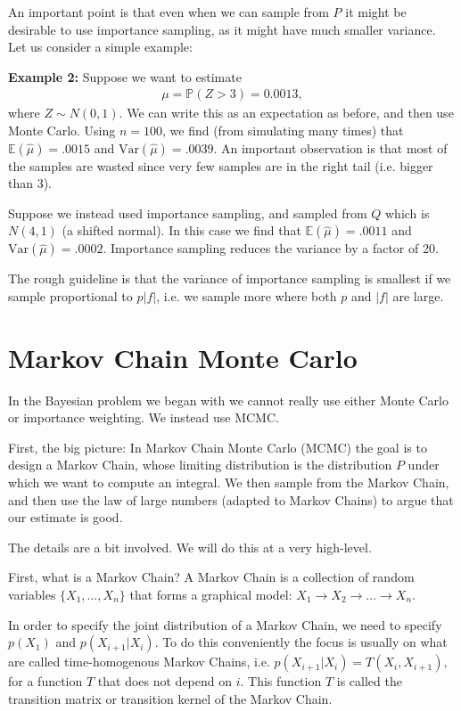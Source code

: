 \documentclass[twoside,12pt]{article}
\begin{document}
An important point is that even when we can sample from $P$ it might be desirable to use importance
sampling, as it might have much smaller variance. Let us consider a simple example:

{\bf Example 2: } Suppose we want to 
estimate 
\begin{align*}
\mu = \mathbb{P}(Z > 3) = 0.0013,
\end{align*}
where $Z \sim N(0,1).$ We can write this as an expectation as before, and
then use Monte Carlo.
Using $n = 100$,   
we find (from simulating many times) that $\mathbb{E}(\widehat{\mu}) = .0015$ 
and $\mathrm{Var}(\widehat{\mu}) = .0039.$
An important observation is that most of the samples are wasted since very few samples are in the right tail (i.e. bigger than 3).

Suppose we instead used importance sampling, and sampled from $Q$ which is
$N(4,1)$ (a shifted normal).
In this case we find that $\mathbb{E}(\widehat{\mu}) = .0011$ and $\mathrm{Var}(\widehat{\mu}) = .0002.$ Importance sampling reduces the variance by a factor of 20. 

The rough guideline is that the variance of importance sampling is smallest if we sample proportional to $p |f|$, i.e. we sample more where both $p$ and $|f|$ are large.

\section{Markov Chain Monte Carlo}
In the Bayesian problem we began with we cannot really use either Monte Carlo or importance weighting. We instead use MCMC.

First, the big picture: In Markov Chain Monte Carlo (MCMC) the goal is to design a Markov Chain, whose limiting distribution is the distribution $P$ under which we want to compute an integral.
We then sample from the Markov Chain, and then use the law of large numbers (adapted to Markov Chains) to argue that our estimate is good.

The details are a bit involved. We will do this at a very high-level.

First, what is a Markov Chain? A Markov Chain is a collection of random variables $\{X_1,\ldots,X_n\}$ that forms a graphical model: $X_1 \rightarrow X_2 \rightarrow \ldots \rightarrow X_n$.

In order to specify the joint distribution of a Markov Chain, we need to specify $p(X_1)$ and $p(X_{i+1}| X_i)$. To do this conveniently the focus is usually on what are called time-homogenous Markov Chains, i.e. $p(X_{i+1}|X_i) = T(X_{i}, X_{i+1}),$ for a function $T$ that does not depend on $i$. This function $T$ is called the transition matrix or transition kernel of the Markov Chain.
\end{document}
